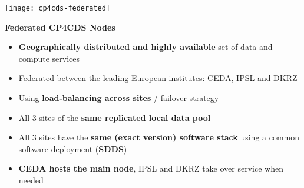 \documentclass[landscape,a0paper,fontscale=0.4]{baposter} %
\newcommand{\compresslist}{%
\setlength{\itemsep}{1pt}%
\setlength{\parskip}{0pt}%
\setlength{\parsep}{0pt}%
}
\begin{document}
\begin{poster}
{ \begin{minipage}{0.4\textwidth}
    \texttt{[image: cp4cds-federated]}
  \end{minipage}
  \begin{minipage}{0.6\textwidth}
    {\bf Federated CP4CDS Nodes}
    \begin{itemize}\compresslist
      \item {\bf Geographically distributed and highly available} set of data and compute services
      \item Federated between the leading European institutes: CEDA, IPSL and DKRZ
      \item Using {\bf load-balancing across sites} / failover strategy
      \item All 3 sites of the {\bf same replicated local data pool}
      \item All 3 sites have the {\bf same (exact version) software stack} using a common software deployment ({\bf SDDS})
      \item {\bf CEDA hosts the main node}, IPSL and DKRZ take over service when needed
    \end{itemize}
  \end{minipage}
 }


\end{poster}
\end{document}
